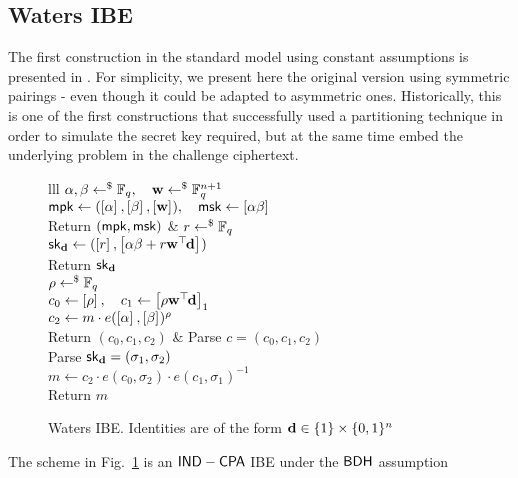 
\subsection{Waters IBE}

The first construction in the standard model using constant assumptions is presented in \cite{EC:Waters05}. 
For simplicity, we present here the original version using symmetric pairings - even though it could be adapted to asymmetric ones.
Historically, this is one of the first constructions that successfully used a partitioning technique in order to simulate the secret key required, but at the same time embed the underlying problem in the challenge ciphertext.

\begin{figure}[htb]
\centering
\begin{pcarray}{lll}
		{
			$\alpha, \beta \rgets \F_q, \quad \vc{w} \rgets \F_q^{n+1}$
				\\
			$\mpk \gets (\gexp{}{\alpha}, \gexp{}{\beta}, \gexp{}{\vc{w}}),
				\quad
			\msk \gets \gexp{}{\alpha \beta}$
				\\
			Return $(\mpk, \msk)$
		}
	&
		{
			$r \rgets \F_q$
				\\
			$\sk_\vc{d} \gets (\gexp{}{r}, \gexp{}{\alpha \beta + r \vc{w}^\trs \vc{d}})$
				\\
			Return $\sk_\vc{d}$
		}
	\\
			{
				$\rho \rgets \F_q$
					\\
				$c_0 \gets \gexp{}{\rho}
					, \quad 
				c_1 \gets \gexp{1}{\rho \vc{w}^\trs \vc{d}}$
					\\
				$c_2 \gets m \cdot e(\gexp{}{\alpha}, \gexp{}{\beta})^\rho$
					\\
				Return $(c_0, c_1, c_2)$
			}
	&
		{
			Parse $c = (c_0, c_1, c_2)$
				\\
			Parse $\sk_\vc{d} = (\sigma_1, \sigma_2)$
				\\
			$m \gets c_2 \cdot e(c_0, \sigma_2) \cdot e(c_1, \sigma_1)^{-1}$
				\\
			Return $m$
		}
\end{pcarray}
\caption{Waters IBE. Identities are of the form $\vc{d} \in \{1\} \times \{0, 1\}^n$}
\label{prot:Waters05:IBE}
\end{figure}

\begin{proposition}
	The scheme in Fig.~\ref{prot:Waters05:IBE} is an $\cd{IND-CPA}$ IBE under the $\cd{BDH}$ assumption
\end{proposition}